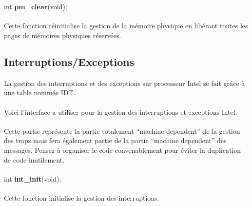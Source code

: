 \documentclass[10pt,a4wide]{article}
\begin{document}
\hspace{1.5cm}int \textbf{pm\_clear}(void);

\paragraph{}

Cette fonction r\'einitialise la gestion de la m\'emoire physique en lib\'erant
toutes les pages de m\'emoires physiques r\'eserv\'ees.

\subsection{Interruptions/Exceptions}

\paragraph{}

La gestion des interruptions et des exceptions sur processeur Intel se fait
gr\^ace \`a une table nomm\'ee IDT.

\paragraph{}

Voici l'interface a utiliser pour la gestion des interruptions et exceptions
Intel.

\paragraph{}

Cette partie repr\'esente la partie totalement ``machine dependent'' de la
gestion des traps mais fera \'egalement partie de la partie
``machine dependent'' des messages. Pensez \`a organiser le code convenablement
pour \'eviter la duplication de code inutilement.

\paragraph{}

\hspace{1.5cm}int \textbf{int\_init}(void);

\paragraph{}

Cette fonction initialise la gestion des interruptions.
\end{document}
